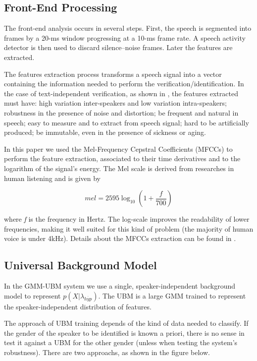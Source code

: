 \documentclass[a4paper,twocolumn]{article}
\begin{document}
\subsection{Front-End Processing}

The front-end analysis occurs in several steps. First, the speech is segmented into frames by a 20-ms window progressing at a 10-ms frame rate. A speech activity detector is then used to discard silence–noise frames. Later the features are extracted.

The features extraction process transforms a speech signal into a vector containing the information needed to perform the verification/identification. In the case of text-independent verification, as shown in \cite{pinheiro_2013}, the features extracted must have: high variation inter-speakers and low variation intra-speakers; robustness in the presence of noise and distortion; be frequent and natural in speech; easy to measure and to extract from speech signal; hard to be artificially produced; be immutable, even in the presence of sickness or aging.

In this paper we used the Mel-Frequency Cepstral Coefficients (MFCCs) \cite{davis_mermelstein_1980} to perform the feature extraction, associated to their time derivatives and to the logarithm of the signal's energy. The Mel scale is derived from researches in human listening and is given by

\begin{equation}
    \label{eq:hertz_to_mel}
    mel = 2595\log_{10} (1 + \frac{f}{700})
\end{equation}

\noindent where \textit{f} is the frequency in Hertz. The log-scale improves the readability of lower frequencies, making it well suited for this kind of problem (the majority of human voice is under 4kHz). Details about the MFCCs extraction can be found in \cite{pinheiro_2013}.

\subsection{Universal Background Model}

In the GMM-UBM system we use a single, speaker-independent background model to represent $p(X|\lambda_{\overline{hyp}})$. The UBM is a large GMM trained to represent the speaker-independent distribution of features.

The approach of UBM training depends of the kind of data needed to classify. If the gender of the speaker to be identified is known a priori, there is no sense in test it against a UBM for the other gender (unless when testing the system's robustness). There are two approachs, as shown in the figure below.
\end{document}
